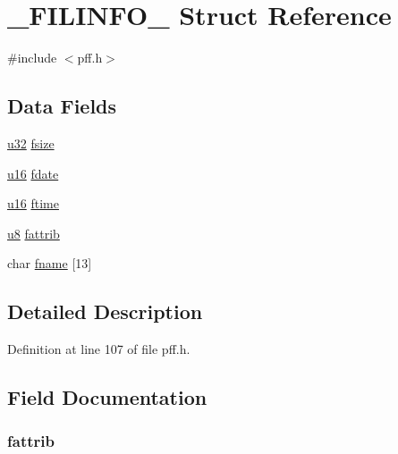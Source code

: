 \hypertarget{struct___f_i_l_i_n_f_o__}{\section{\-\_\-\-F\-I\-L\-I\-N\-F\-O\-\_\- Struct Reference}
\label{struct___f_i_l_i_n_f_o__}
}


{\ttfamily \#include $<$pff.\-h$>$}

\subsection*{Data Fields}
\begin{DoxyCompactItemize}
\item 
\hyperlink{p8_2pinguino_2core_2typedef_8h_a2caf5cd7bcdbe1eefa727f44ffb10bac}{u32} \hyperlink{struct___f_i_l_i_n_f_o___a41a315139292b6c76b0327509c3ac625}{fsize}
\item 
\hyperlink{p8_2pinguino_2core_2typedef_8h_a50b0d1c7a54fa09a64a3ac111c778520}{u16} \hyperlink{struct___f_i_l_i_n_f_o___a08bd6d7fd57525f52a5cf69a094aef92}{fdate}
\item 
\hyperlink{p8_2pinguino_2core_2typedef_8h_a50b0d1c7a54fa09a64a3ac111c778520}{u16} \hyperlink{struct___f_i_l_i_n_f_o___af3c6c0f578435129300dd58488296abb}{ftime}
\item 
\hyperlink{p8_2pinguino_2core_2typedef_8h_aed742c436da53c1080638ce6ef7d13de}{u8} \hyperlink{struct___f_i_l_i_n_f_o___adaf20eb202c84628f109d82b832bfcb0}{fattrib}
\item 
char \hyperlink{struct___f_i_l_i_n_f_o___a892e7cf177f62142700c31c64dedb50b}{fname} \mbox{[}13\mbox{]}
\end{DoxyCompactItemize}


\subsection{Detailed Description}


Definition at line 107 of file pff.\-h.



\subsection{Field Documentation}
\hypertarget{struct___f_i_l_i_n_f_o___adaf20eb202c84628f109d82b832bfcb0}{
\subsubsection[{fattrib}]{ fattrib}}\label{struct___f_i_l_i_n_f_o___adaf20eb202c84628f109d82b832bfcb0}


